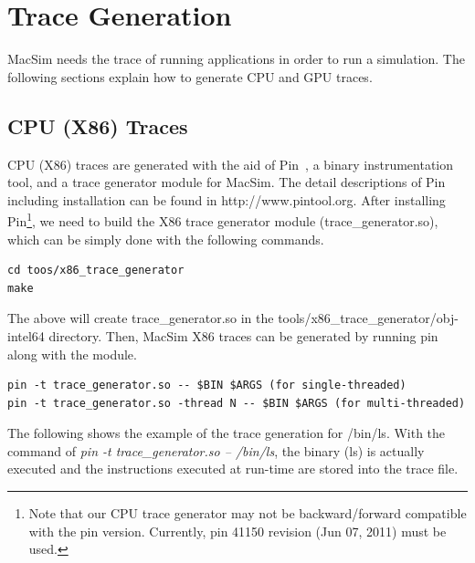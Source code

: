 


\chapter{Trace Generation}
\label{sec:trace_generation}


MacSim needs the trace of running applications in order to run a simulation.
The following sections explain how to generate CPU and GPU traces.


\section{CPU (X86) Traces}

CPU (X86) traces are generated with the aid of Pin~\cite{pin}, a binary instrumentation 
tool, and a trace generator module for MacSim.  The detail descriptions of Pin
including installation can be found in http://www.pintool.org.  After
installing Pin\footnote{Note that our CPU trace generator may not be
backward/forward compatible with the pin version. Currently, pin 41150
revision (Jun 07, 2011) must be used.}, we need to build the X86 trace
generator module (trace\_generator.so), which can be simply done with the following commands.



\begin{Verbatim}
cd toos/x86_trace_generator
make
\end{Verbatim}

\noindent
The above will create trace\_generator.so in the tools/x86\_trace\_generator/obj-intel64 directory. 
Then, MacSim X86 traces can be generated by running pin along with the module. 


\begin{Verbatim}
pin -t trace_generator.so -- $BIN $ARGS (for single-threaded)
pin -t trace_generator.so -thread N -- $BIN $ARGS (for multi-threaded)
\end{Verbatim}


The following shows the example of the trace generation for /bin/ls. 
With the command of \emph{pin -t trace\_generator.so -- /bin/ls}, the binary (ls) is 
actually executed and the instructions executed at run-time are stored into the trace file.


